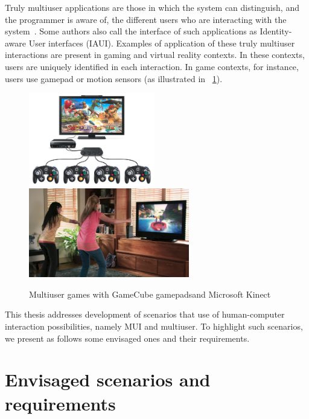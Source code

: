 \documentclass[
  doutorado,
  american
]{ThesisPUC}
\newcommand{\fig}[1]{\figurename~\ref{#1}}
\newcommand{\captionvspace}{\vspace{-1.3em}}
\begin{document}
Truly multiuser applications are those in which the system can distinguish, and
the programmer is aware of, the different users who are interacting with the
system~\cite{haber_modeling_2001}. Some authors \cite{laurillau} also call the 
interface of
such applications as Identity-aware User interfaces (IAUI). Examples of
application of these truly multiuser interactions are present in gaming and
virtual reality contexts. In these contexts, users are uniquely identified in
each interaction. In game contexts, for instance, users use gamepad or motion
sensors (as illustrated in \fig{fig:multiuser}). 

\begin{figure}[!ht]
\begin{center}
	\includegraphics[width=5.5cm, keepaspectratio]{img/img2a.png}
	\includegraphics[width=7cm, keepaspectratio]{img/img2b.png}
	\caption[Multiuser games]{Multiuser games with GameCube
	gamepads\footnotemark and Microsoft Kinect\footnotemark}
	\label{fig:multiuser}
    \captionvspace
\end{center}
\end{figure}


This thesis addresses development of scenarios that use of human-computer
interaction possibilities, namely MUI and multiuser. To highlight such
scenarios, we present as follows some envisaged ones and their requirements.

\section{Envisaged scenarios and requirements}
\label{sec:intro:scenarios}
\end{document}

